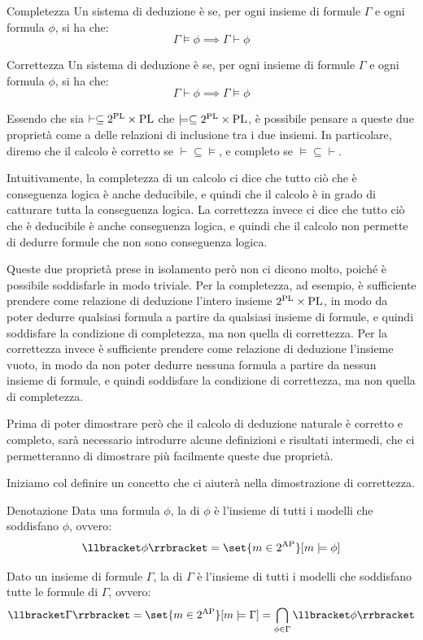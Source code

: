 \begin{definition}{Completezza}
  Un sistema di deduzione è  se, per ogni insieme di formule \(\Gamma\) e ogni formula \(\phi\), si ha che:
  \[\Gamma \models \phi \implies \Gamma \vdash \phi\]
\end{definition}

\begin{definition}{Correttezza}
  Un sistema di deduzione è  se, per ogni insieme di formule \(\Gamma\) e ogni formula \(\phi\), si ha che:
  \[\Gamma \vdash \phi \implies \Gamma \models \phi\]
\end{definition}

Essendo che sia \(\vdash \subseteq 2^{\operatorname{PL}}\times\operatorname{PL}\) che \(\models \subseteq 2^{\operatorname{PL}}\times\operatorname{PL}\), è possibile pensare a queste due proprietà come a delle relazioni di inclusione tra i due insiemi. In particolare, diremo che il calcolo è corretto se \(\vdash \subseteq \models\), e completo se \(\models \subseteq \vdash\).

Intuitivamente, la completezza di un calcolo ci dice che tutto ciò che è conseguenza logica è anche deducibile, e quindi che il calcolo è in grado di catturare tutta la conseguenza logica. La correttezza invece ci dice che tutto ciò che è deducibile è anche conseguenza logica, e quindi che il calcolo non permette di dedurre formule che non sono conseguenza logica.

Queste due proprietà prese in isolamento però non ci dicono molto, poiché è possibile soddisfarle in modo triviale. Per la completezza, ad esempio, è sufficiente prendere come relazione di deduzione l'intero insieme \(2^{\operatorname{PL}}\times\operatorname{PL}\), in modo da poter dedurre qualsiasi formula a partire da qualsiasi insieme di formule, e quindi soddisfare la condizione di completezza, ma non quella di correttezza. Per la correttezza invece è sufficiente prendere come relazione di deduzione l'insieme vuoto, in modo da non poter dedurre nessuna formula a partire da nessun insieme di formule, e quindi soddisfare la condizione di correttezza, ma non quella di completezza.

Prima di poter dimostrare però che il calcolo di deduzione naturale è corretto e completo, sarà necessario introdurre alcune definizioni e risultati intermedi, che ci permetteranno di dimostrare più facilmente queste due proprietà.

Iniziamo col definire un concetto che ci aiuterà nella dimostrazione di correttezza.

\begin{definition}{Denotazione}
  Data una formula \(\phi\), la  di \(\phi\) è l'insieme di tutti i modelli che soddisfano \(\phi\), ovvero:
  \[\den{\phi} = \set{m \in 2^{\AP}}[ m \models \phi]\]

  Dato un insieme di formule \(\Gamma\), la  di \(\Gamma\) è l'insieme di tutti i modelli che soddisfano tutte le formule di \(\Gamma\), ovvero:
  \[\den{\Gamma} = \set{m \in 2^{\AP}}[ m \models \Gamma] = \bigcap_{\phi \in \Gamma} \den{\phi}\]
\end{definition}

